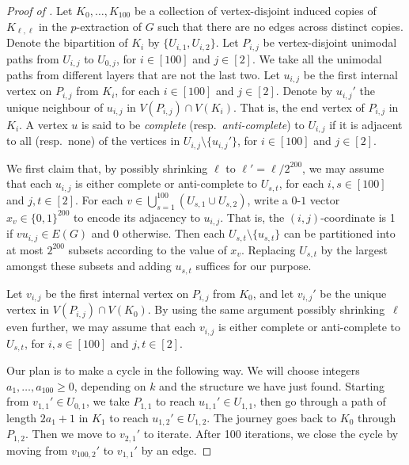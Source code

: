 \documentclass[11pt,english]{article}
\theoremstyle{plain}
\theoremstyle{definition}
\theoremstyle{remark}
\begin{document}
	\begin{proof} [Proof of ]
	Let $K_0, \ldots, K_{100}$ be a collection of vertex-disjoint induced copies of $K_{\ell, \ell}$ in the $p$-extraction of $G$ such that there are no edges across distinct copies. Denote the bipartition of $K_i$ by $\{U_{i, 1}, U_{i, 2}\}$.
	Let $P_{i, j}$ be vertex-disjoint unimodal paths from $U_{i, j}$ to $U_{0, j}$, for $i \in [100]$ and $j \in [2]$.
	We take all the unimodal paths from different layers that are not the last two. 
	Let $u_{i,j}$ be the first internal vertex on $P_{i,j}$ from $K_i$, for each $i \in [100]$ and $j \in [2]$. 
	Denote by $u_{i,j}'$ the unique neighbour of $u_{i,j}$ in $V(P_{i,j})\cap V(K_i)$. That is, the end vertex of $P_{i,j}$ in $K_i$.
	A vertex $u$ is said to be \emph{complete} (resp.\ \emph{anti-complete}) to $U_{i,j}$ if it is adjacent to all (resp.\ none) of the vertices in $U_{i,j}\setminus\{u_{i,j}'\}$, for $i \in [100]$ and $j \in [2]$. 
	
	We first claim that, by possibly shrinking $\ell$ to $\ell'=\ell/2^{200}$, we may assume that each $u_{i,j}$ is either complete or anti-complete to $U_{s,t}$, for each $i, s \in [100]$ and $j, t \in [2]$.
	For each $v\in \bigcup_{s=1}^{100}(U_{s,1}\cup U_{s,2})$, write a $0$-$1$ vector $x_v\in\{0,1\}^{200}$ to encode its adjacency to $u_{i,j}$. That is, the $(i,j)$-coordinate is 1 if $vu_{i,j}\in E(G)$ and 0 otherwise.
	Then each $U_{s, t}\setminus\{u_{s, t}\}$ can be partitioned into at most $2^{200}$ subsets according to the value of $x_v$. Replacing $U_{s, t}$ by the largest amongst these subsets and adding $u_{s, t}$ suffices for our purpose.
	
	Let $v_{i,j}$ be the first internal vertex on $P_{i,j}$ from $K_0$, and let $v_{i,j}'$ be the unique vertex in $V(P_{i, j}) \cap V(K_0)$. 
	By using the same argument possibly shrinking~$\ell$ even further, we may assume that each $v_{i,j}$ is either complete or anti-complete to $U_{s, t}$, for $i, s \in [100]$ and $j, t \in [2]$.
	
	Our plan is to make a cycle in the following way. We will choose integers $a_1,\ldots,a_{100} \ge 0$, depending on $k$ and the structure we have just found. Starting from $v_{1,1}' \in U_{0,1}$, we take $P_{1,1}$ to reach $u_{1,1}'\in U_{1,1}$, then go through a path of length $2a_1+1$ in $K_1$ to reach $u_{1,2}'\in U_{1,2}$. The journey goes back to $K_0$ through $P_{1,2}$. Then we move to $v_{2,1}'$ to iterate. 
	After 100 iterations, we close the cycle by moving from $v_{100,2}'$ to $v_{1,1}'$ by an edge.
	

\end{proof}
\end{document}
